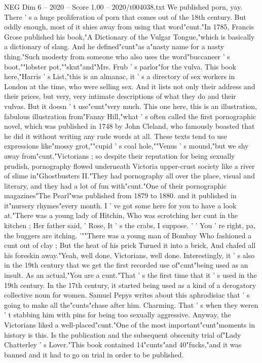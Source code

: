 \begin{textsample}{NEG Dim 6 – 2020 – Score 1.00 – 2020/t004038.txt}
We published porn, yay.
There ' s a huge proliferation of porn that comes out of the 18th century.
But oddly enough, most of it shies away from using that word"cunt."In 1785, Francis Grose published his book,"A Dictionary of the Vulgar Tongue,"which is basically a dictionary of slang.
And he defined"cunt"as a"nasty name for a nasty thing."Such modesty from someone who also uses the word"buccaneer ' s boot,""lobster pot,""skut"and"Mrs.
Frub ' s parlor"for the vulva.
This book here,"Harris ' s List,"this is an almanac, it ' s a directory of sex workers in London at the time, who were selling sex.
And it lists not only their address and their prices, but very, very intimate descriptions of what they do and their vulvas.
But it doesn ' t use"cunt"very much.
This one here, this is an illustration, fabulous illustration from"Fanny Hill,"what ' s often called the first pornographic novel, which was published in 1748 by John Cleland, who famously boasted that he did it without writing any rude words at all.
These texts tend to use expressions like"mossy grot,""cupid ' s coal hole,""Venus ' s mound,"but we shy away from"cunt."Victorians ; so despite their reputation for being sexually prudish, pornography flowed underneath Victoria upper-crust society like a river of slime in"Ghostbusters II."They had pornography all over the place, visual and literary, and they had a lot of fun with"cunt."One of their pornographic magazines"The Pearl"was published from 1879 to 1880. and it published in it"nursery rhymes"every month.
I ' ve got some here for you to have a look at."There was a young lady of Hitchin, Who was scrotching her cunt in the kitchen ; Her father said, ' Rose, It ' s the crabs, I suppose. ' ' You ' re right, pa, the buggers are itching. '""There was a young man of Bombay Who fashioned a cunt out of clay ; But the heat of his prick Turned it into a brick, And chafed all his foreskin away."Yeah, well done, Victorians, well done.
Interestingly, it ' s also in the 19th century that we get the first recorded use of"cunt"being used as an insult.
As an actual,"You are a cunt."That ' s the first time that it ' s used in the 19th century.
In the 17th century, it started being used as a kind of a derogatory collective noun for women.
Samuel Pepys writes about this aphrodisiac that ' s going to make all the"cunts"chase after him.
Charming.
That ' s when they weren ' t stabbing him with pins for being too sexually aggressive.
Anyway, the Victorians liked a well-placed"cunt."One of the most important"cunt"moments in history is this.
Is the publication and the subsequent obscenity trial of"Lady Chatterley ' s Lover."This book contained 14"cunts"and 40"fucks,"and it was banned and it had to go on trial in order to be published.

\end{textsample}
